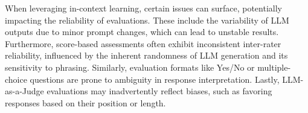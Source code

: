 \documentclass[acmsmall,screen]{acmart}
\begin{document}

    













\begin{tcolorbox}[colback=white!5, colframe=black, title={Reliability Concerns of In-Context Learning}]
When leveraging in-context learning, certain issues can surface, potentially impacting the reliability of evaluations. These include the variability of LLM outputs due to minor prompt changes, which can lead to unstable results. Furthermore, score-based assessments often exhibit inconsistent inter-rater reliability, influenced by the inherent randomness of LLM generation and its sensitivity to phrasing. Similarly, evaluation formats like Yes/No or multiple-choice questions are prone to ambiguity in response interpretation. Lastly, LLM-as-a-Judge evaluations may inadvertently reflect biases, such as favoring responses based on their position or length. 
\end{tcolorbox}








\end{document}
